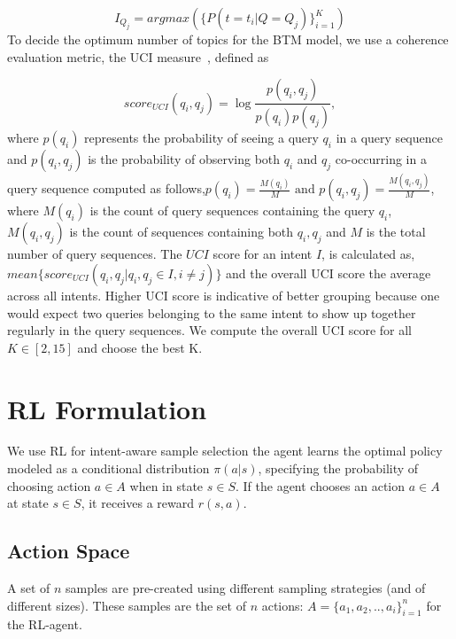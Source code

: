 {\small
\begin{equation}
    I_{Q_j} = argmax(\{P(t=t_i | Q=Q_j)\}_{i=1}^K)
\end{equation}
}
To decide the optimum number of topics for the BTM model, we use a coherence evaluation metric, the UCI measure~\cite{newman2010evaluating}, defined as

{\small
\begin{equation}
    score_{UCI}(q_i, q_j) = \log{\frac{p(q_i, q_j)}{p(q_i)p(q_j)}},
\end{equation}
}
where $p(q_i)$ represents the probability of seeing a query $q_i$ in a query sequence and $p(q_i, q_j)$ is the probability of observing both $q_i$ and $q_j$ co-occurring in a query sequence computed as follows,$p(q_i) = \frac{M(q_i)}{M} \text{ and } p(q_i, q_j) = \frac{M(q_i, q_j)}{M}$, where $M(q_i)$ is the count of query sequences containing the query $q_i$, $M(q_i, q_j)$ is the count of sequences containing both $q_i, q_j$ and $M$ is the total number of query sequences.
The $UCI$ score for an intent $I$, is calculated as, $mean\{score_{UCI}(q_i,q_j | q_i, q_j \in I, i \neq j)\}$ and the overall UCI score the average across all intents. Higher UCI score is indicative of better grouping because one would expect two queries belonging to the same intent to show up together regularly in the query sequences. We compute the overall UCI score for all $K \in [2,15]$ and choose the best K.



\section{RL Formulation}

We use RL for intent-aware sample selection the agent learns the optimal policy modeled as a conditional distribution $\pi(a|s)$, specifying the probability of choosing action $a \in A$ when in state $s \in S$. 
If the agent chooses an action $a \in A$ at state $s \in S$, it receives a reward $r(s,a)$.

\subsection{Action Space}
\vspace{-0.2em}
A set of $n$ samples are pre-created using different sampling strategies (and of different sizes). 
These samples are the set of $n$ actions: $A = \{a_1, a_2, .., a_i\}_{i=1}^n$ for the RL-agent.

